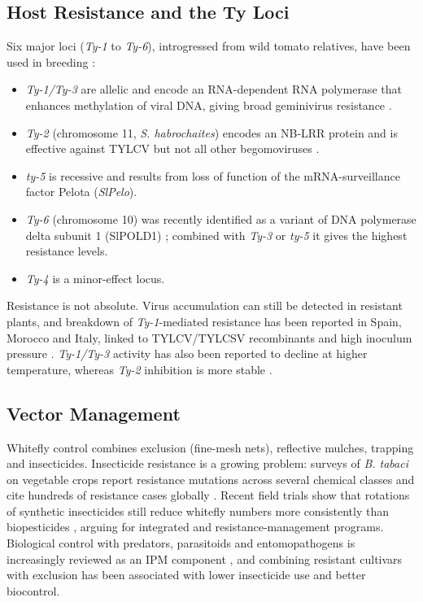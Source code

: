 \documentclass[journal]{IEEEtran}
\begin{document}
\subsection{Host Resistance and the Ty Loci}
Six major loci (\textit{Ty-1} to \textit{Ty-6}), introgressed from wild tomato relatives, have been used in breeding \cite{yan2021,elsappah2022}:
\begin{itemize}
\item \textit{Ty-1/Ty-3} are allelic and encode an RNA-dependent RNA polymerase that enhances methylation of viral DNA, giving broad geminivirus resistance \cite{elsappah2022}.
\item \textit{Ty-2} (chromosome 11, \textit{S. habrochaites}) encodes an NB-LRR protein and is effective against TYLCV but not all other begomoviruses \cite{elsappah2022}.
\item \textit{ty-5} is recessive and results from loss of function of the mRNA-surveillance factor Pelota (\textit{SlPelo}).
\item \textit{Ty-6} (chromosome 10) was recently identified as a variant of DNA polymerase delta subunit 1 (SlPOLD1) \cite{ty6_2024}; combined with \textit{Ty-3} or \textit{ty-5} it gives the highest resistance levels.
\item \textit{Ty-4} is a minor-effect locus.
\end{itemize}
Resistance is not absolute. Virus accumulation can still be detected in resistant plants, and breakdown of \textit{Ty-1}-mediated resistance has been reported in Spain, Morocco and Italy, linked to TYLCV/TYLCSV recombinants and high inoculum pressure \cite{elsappah2022,temp2021}. \textit{Ty-1/Ty-3} activity has also been reported to decline at higher temperature, whereas \textit{Ty-2} inhibition is more stable \cite{temp2021}.

\subsection{Vector Management}
Whitefly control combines exclusion (fine-mesh nets), reflective mulches, trapping and insecticides. Insecticide resistance is a growing problem: surveys of \textit{B. tabaci} on vegetable crops report resistance mutations across several chemical classes and cite hundreds of resistance cases globally \cite{insects2024}. Recent field trials show that rotations of synthetic insecticides still reduce whitefly numbers more consistently than biopesticides \cite{florida2023}, arguing for integrated and resistance-management programs. Biological control with predators, parasitoids and entomopathogens is increasingly reviewed as an IPM component \cite{biocontrol2025}, and combining resistant cultivars with exclusion has been associated with lower insecticide use and better biocontrol.
\end{document}
